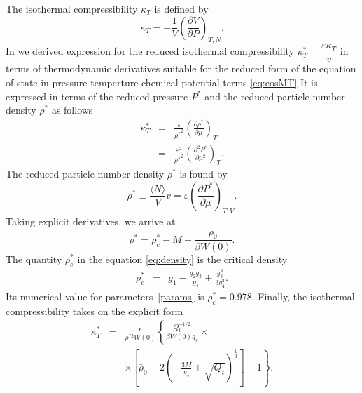 The isothermal compressibility $\kappa_T$ is defined by
\begin{equation}
	\label{def:isotherm_compres}
	\kappa_T = -\frac{1}{V}\left(\frac{\partial V}{\partial P}\right)_{T, N}.
\end{equation}
In \cite{DKRP24arxiv,DKRP24} we derived expression for the reduced isothermal compressibility $\kappa^*_T \equiv \dfrac{\varepsilon \kappa_T}{v}$  in terms of thermodynamic derivatives suitable for the reduced form of the equation of state in pressure-temperture-chemical potential terms \eqref{eq:eosMT} 
It is expressed in terms of the reduced pressure $P^*$ and the reduced particle number density $\rho^*$ as follows
\begin{eqnarray}
	\label{eq:kappa_star_m1}
	\kappa^*_T & = & \frac{\varepsilon}{{\rho^*}^2} \left(\frac{\partial \rho^*}{\partial \mu}\right)_T
	\\
	\label{eq:kappa_star_m}
	& = & \frac{\varepsilon^2}{{\rho^*}^2} \left(\frac{\partial^2 P^*}{\partial \mu^2}\right)_T.
\end{eqnarray}
The reduced particle number density $\rho^*$ is found by 
\begin{equation}
	\rho^* \equiv \frac{\langle N \rangle}{V} v = \varepsilon\left(\frac{\partial P^*}{\partial \mu}\right)_{T,V}.
\end{equation}
Taking explicit derivatives, we arrive at
\begin{equation}\label{eq:density}
	\rho^* = \rho^*_c - M + \frac{ \bar \rho_0}{\beta W(0)}.
\end{equation}
The quantity $\rho^*_c$ in the equation \eqref{eq:density} is the critical density~\cite{KD20,DKRP24arxiv,DKRP24}
\begin{eqnarray}\label{eq:crit_dens}
	\rho^*_c & = &  g_1 - \frac{g_2 g_3}{g_4} + \frac{g_3^3}{3g_4^2}.
\end{eqnarray}
Its numerical value for parameters~\eqref{params} is $\rho^*_c = 0.978$.
Finally, the isothermal compressibility takes on the explicit form  
\begin{eqnarray}
	\kappa_T^* & = & \frac{\epsilon}{\rho^{*2} W(0)}
	\left\{   \frac{Q_t^{-1/2}}{\beta W(0) g_4} \right. \times
	\\ 
	&&\left. \times \left[ \bar \rho_0 - 2 \left( - \frac{3M}{g_4} + \sqrt{Q_t} \right)^{\frac{1}{3}} \right] -1 \right\}.
	\nonumber
\end{eqnarray}
